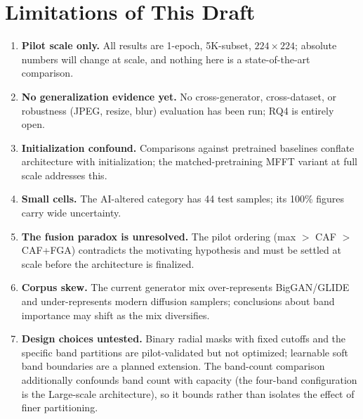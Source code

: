 \documentclass[journal]{IEEEtran}
\begin{document}
\section{Limitations of This Draft}
\begin{enumerate}
    \item \textbf{Pilot scale only.} All results are 1-epoch, 5K-subset, $224\times224$; absolute numbers will change at scale, and nothing here is a state-of-the-art comparison.
    \item \textbf{No generalization evidence yet.} No cross-generator, cross-dataset, or robustness (JPEG, resize, blur) evaluation has been run; RQ4 is entirely open.
    \item \textbf{Initialization confound.} Comparisons against pretrained baselines conflate architecture with initialization; the matched-pretraining MFFT variant at full scale addresses this.
    \item \textbf{Small cells.} The AI-altered category has 44 test samples; its 100\% figures carry wide uncertainty.
    \item \textbf{The fusion paradox is unresolved.} The pilot ordering (max $>$ CAF $>$ CAF+FGA) contradicts the motivating hypothesis and must be settled at scale before the architecture is finalized.
    \item \textbf{Corpus skew.} The current generator mix over-represents BigGAN/GLIDE and under-represents modern diffusion samplers; conclusions about band importance may shift as the mix diversifies.
    \item \textbf{Design choices untested.} Binary radial masks with fixed cutoffs and the specific band partitions are pilot-validated but not optimized; learnable soft band boundaries are a planned extension. The band-count comparison additionally confounds band count with capacity (the four-band configuration is the Large-scale architecture), so it bounds rather than isolates the effect of finer partitioning.
\end{enumerate}

\end{document}
